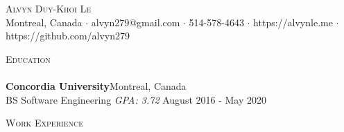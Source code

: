 \documentclass[a4paper]{article}
\newcommand{\lineunder} {
    \vspace*{-8pt} \\
    \hspace*{-18pt} \hrulefill \\
}
\newcommand{\header} [1] {
    {\hspace*{-18pt}\vspace*{6pt} \textsc{#1}}
    \vspace*{-6pt} \lineunder
}
\begin{document}
\vspace*{-40pt}

    

\vspace*{-10pt}
\begin{center}
	{\Huge \scshape {Alvyn Duy-Khoi Le}}\\
	Montreal, Canada $\cdot$ alvyn279@gmail.com $\cdot$ 514-578-4643 $\cdot$ https://alvynle.me  $\cdot$ https://github.com/alvyn279\\
\end{center}

\header{Education}
\textbf{Concordia University}\hfill Montreal, Canada\\
BS Software Engineering \textit{GPA: 3.72} \hfill August 2016 - May 2020\\
\vspace{2mm}

\header{Work Experience}
\vspace{1mm}
\end{document}
